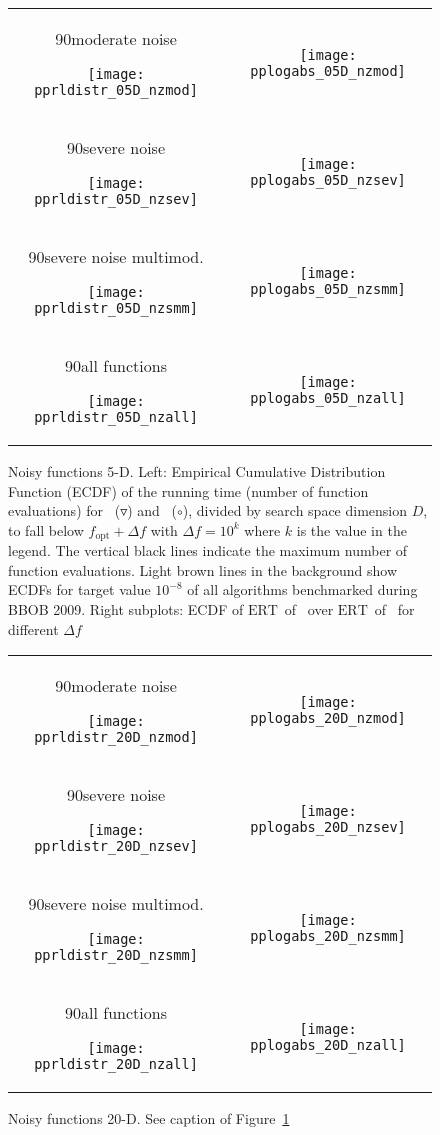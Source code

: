 \documentclass{article}
\newcommand{\ERT}{\ensuremath{\mathrm{ERT}}}
\newcommand{\Df}{\ensuremath{\Delta f}}
\newcommand{\fopt}{\ensuremath{f_\mathrm{opt}}}
\newcommand{\rot}[2][2.5]{
  \hspace*{-3.5\baselineskip}%
  \begin{rotate}{90}\hspace{#1em}#2
  \end{rotate}}
\begin{document}
\begin{figure}[htbp!]
\centering
\begin{tabular}{@{}c@{}c@{}}
\rot[2.]{moderate noise}
\texttt{[image: pprldistr\_05D\_nzmod]} &
\texttt{[image: pplogabs\_05D\_nzmod]}
\\[-1ex]
\rot[2.8]{severe noise}
\texttt{[image: pprldistr\_05D\_nzsev]} &
\texttt{[image: pplogabs\_05D\_nzsev]}
\\[-1ex]
\rot[0.7]{severe noise multimod.}
\texttt{[image: pprldistr\_05D\_nzsmm]} &
\texttt{[image: pplogabs\_05D\_nzsmm]}\\[-1ex]
\rot[2.8]{all functions}
\texttt{[image: pprldistr\_05D\_nzall]} &
\texttt{[image: pplogabs\_05D\_nzall]}
\end{tabular}
\caption{\label{fig:RLDs05D}Noisy functions 5-D. Left:
Empirical Cumulative Distribution Function (ECDF) of the running time (number
of function evaluations) for \algorithmB\ ($\triangledown$) and \algorithmA\ ($\circ$), divided by
search space dimension $D$, to fall below $\fopt+\Df$ with $\Df = 10^k$ where
$k$ is the value in the legend. The vertical black lines indicate the maximum
number of function evaluations. Light brown lines in the background show ECDFs
for target value $10^{-8}$ of all algorithms benchmarked during BBOB 2009.
Right subplots: ECDF of \ERT\ of \algorithmB\ over \ERT\ of \algorithmA\ for
different $\Df$}
\end{figure}
\begin{figure}[htbp!]
\centering
\begin{tabular}{@{}c@{}c@{}}
\rot[2.]{moderate noise}
\texttt{[image: pprldistr\_20D\_nzmod]} &
\texttt{[image: pplogabs\_20D\_nzmod]}
\\[-1ex]
\rot[2.8]{severe noise}
\texttt{[image: pprldistr\_20D\_nzsev]} &
\texttt{[image: pplogabs\_20D\_nzsev]}
\\[-1ex]
\rot[0.7]{severe noise multimod.}
\texttt{[image: pprldistr\_20D\_nzsmm]} &
\texttt{[image: pplogabs\_20D\_nzsmm]}\\[-1ex]
\rot[2.8]{all functions}
\texttt{[image: pprldistr\_20D\_nzall]} &
\texttt{[image: pplogabs\_20D\_nzall]}
\end{tabular}
\caption{\label{fig:RLDs20D}Noisy functions 20-D. See caption of Figure~\ref{fig:RLDs05D}}
\end{figure}
\end{document}
